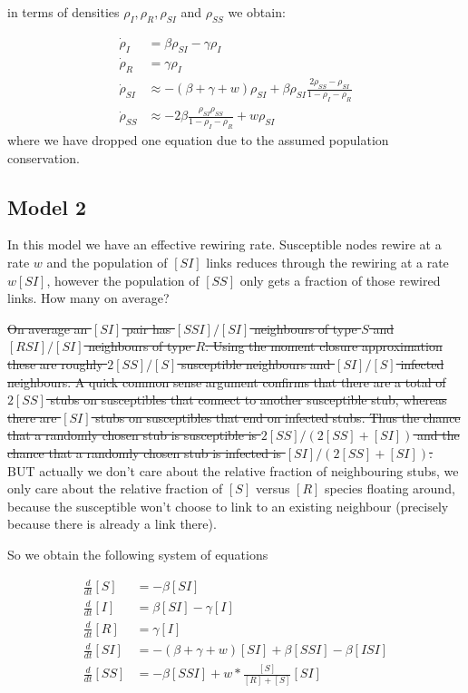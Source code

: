 \documentclass[a4paper,10pt]{article}
\begin{document}
 in terms of densities $\rho_I,\rho_R, \rho_{SI}$ and $\rho_{SS}$ we obtain:
 
 \begin{align}
  \dot \rho_I 
  &=
   \beta \rho_{SI} - \gamma \rho_I \label{eq:rhoI}
   \\
     \dot \rho_R 
  &=
    \gamma \rho_I\label{eq:rhoR}
\\
    \dot \rho_{SI}
&\approx
-(\beta+\gamma+w) \rho_{SI} +\beta \rho_{SI}\frac{ 2 \rho_{SS}-\rho_{SI}  }{1-\rho_I-\rho_R}\label{eq:rhoSI}
\\
    \dot \rho_{SS}
&\approx
 -2\beta \frac{\rho_{SI} \rho_{SS}}{1-\rho_I-\rho_R} +w\rho_{SI}\label{eq:rhoSS}
 \end{align}
where we have dropped one equation due to the assumed population conservation.

\subsection{Model 2}

In this model we have an effective rewiring rate. Susceptible nodes rewire at a rate $w$ and the population of $[SI]$ links reduces through the rewiring at a rate $w[SI]$, however the population of $[SS]$ only gets a fraction of those rewired links. How many on average?

\sout{On average an $[SI]$ pair has $[SSI]/[SI]$ neighbours of type $S$ and $[RSI]/[SI]$ neighbours of type $R$. Using the moment closure approximation these are roughly $2[SS]/[S]$ susceptible neighbours and $[SI]/[S]$ infected neighbours. A quick common sense argument confirms that there are a total of $2[SS]$ stubs on susceptibles that connect to another susceptible stub, whereas there are $[SI]$ stubs on susceptibles that end on infected stubs. Thus the chance that a randomly chosen stub is susceptible is $2[SS]/(2[SS]+[SI])$ and the chance that a randomly chosen stub is infected is $[SI]/(2[SS]+[SI])$.} BUT actually we don't care about the relative fraction of neighbouring stubs, we only care about the relative fraction of $[S]$ versus $[R]$ species floating around, because the susceptible won't choose to link to an existing neighbour (precisely because there is already a link there).

So we obtain the following system of equations


\begin{align}
 \frac{d}{dt} [S]
 &=
 -\beta [SI]
 \\
 \frac{d}{dt} [I]
 &=
 \beta [SI] - \gamma [I]
 \\
 \frac{d}{dt} [R]
 &=
\gamma [I]
 \\
 \frac{d}{dt} [SI]
 &=
 -(\beta+\gamma+w)[SI] + \beta[SSI] -\beta[ISI] 
 \\
 \frac{d}{dt} [SS]
 &=
- \beta [SSI] + w*\frac{[S]}{[R]+[S]} [SI]
 \end{align}
 
\end{document}

